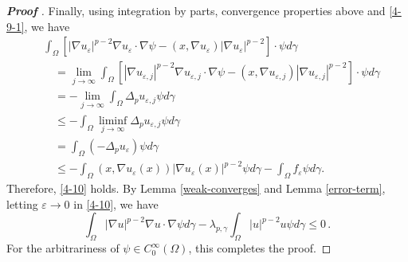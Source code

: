 \documentclass[12pt]{amsart}
\newcommand{\1}{\mathbf 1}
\begin{document}
\begin{proof}[\bf Proof ]
Finally, using integration by parts, convergence properties above and \eqref{4-9-1}, we have
\begin{align*}
&\int_{\Omega} \left[|\nabla u_{\varepsilon}|^{p-2} \nabla u_{\varepsilon} \cdot \nabla \psi -(x,\nabla u_{\varepsilon})|\nabla u_{\varepsilon}|^{p-2}\right] \cdot \psi d\gamma \\
&\quad=\mathop{\lim}_{j\rightarrow \infty}\int_{\Omega} \left[|\nabla u_{\varepsilon,j}|^{p-2} \nabla u_{\varepsilon,j} \cdot \nabla \psi -(x,\nabla u_{\varepsilon,j})|\nabla u_{\varepsilon,j}|^{p-2}\right] \cdot \psi d\gamma\\
&\quad =-\mathop{\lim }_{j\rightarrow \infty} \int_{\Omega} \Delta_p u_{\varepsilon,j} \psi d\gamma\\
&\quad \leq -\int_{\Omega}\mathop{\lim \inf}_{j\rightarrow \infty} \Delta_p u_{\varepsilon,j} \psi d\gamma\\
&\quad =\int_\Omega (-\Delta_p u_\varepsilon) \psi d\gamma\\
&\quad \leq -\int_\Omega (x,\nabla u_\varepsilon(x))|\nabla u_\varepsilon(x)|^{p-2}\psi d\gamma-\int_{\Omega}f_\varepsilon \psi d\gamma.
\end{align*}
Therefore, \eqref{4-10} holds. By Lemma \ref{weak-converges} and Lemma \ref{error-term}, letting $\varepsilon \rightarrow 0$ in \eqref{4-10}, we have
\[
\int_\Omega |\nabla u|^{p-2} \nabla {u} \cdot \nabla \psi d\gamma - \lambda_{p,\gamma} \int_{\Omega} |u|^{p-2} u \psi d\gamma\leq 0\,.
\]
For the arbitrariness of $\psi \in C^{\infty}_0(\Omega)$, this completes the proof.


\end{proof}
\end{document}
